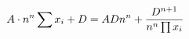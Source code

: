 \documentclass[preview]{standalone}
\begin{document}
\begin{align*}
\special{dvisvgm:raw <g id='unique000'>}A \cdot n^n \sum x_i + D = A D n^n + \frac{D^{n+1}}{n^n \prod x_i}\special{dvisvgm:raw </g>}
\end{align*}
\end{document}
